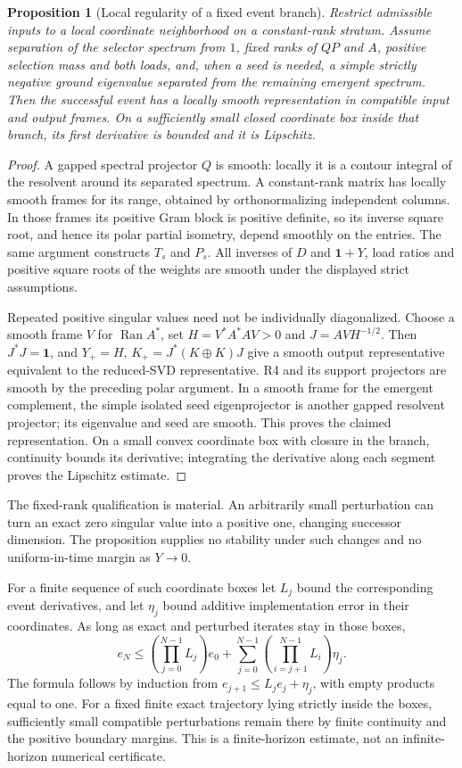 \documentclass[11pt,letterpaper]{article}
\newcommand{\Ran}{\operatorname{Ran}}
\newcommand{\Id}{\mathbf 1}
\newtheorem{proposition}[theorem]{Proposition}
\theoremstyle{definition}
\numberwithin{equation}{section}
\begin{document}
\begin{proposition}[Local regularity of a fixed event branch]\label{branchregular}
Restrict admissible inputs to a local coordinate neighborhood on a constant-rank stratum. Assume separation of the selector spectrum from $1$, fixed ranks of $QP$ and $A$, positive selection mass and both loads, and, when a seed is needed, a simple strictly negative ground eigenvalue separated from the remaining emergent spectrum. Then the successful event has a locally smooth representation in compatible input and output frames. On a sufficiently small closed coordinate box inside that branch, its first derivative is bounded and it is Lipschitz.
\end{proposition}
\begin{proof}
A gapped spectral projector $Q$ is smooth: locally it is a contour integral of the resolvent around its separated spectrum. A constant-rank matrix has locally smooth frames for its range, obtained by orthonormalizing independent columns. In those frames its positive Gram block is positive definite, so its inverse square root, and hence its polar partial isometry, depend smoothly on the entries. The same argument constructs $T_s$ and $P_s$. All inverses of $D$ and $\Id+Y$, load ratios and positive square roots of the weights are smooth under the displayed strict assumptions.

Repeated positive singular values need not be individually diagonalized. Choose a smooth frame $V$ for $\Ran A^*$, set $H=V^*A^*AV>0$ and $J=AVH^{-1/2}$. Then $J^*J=\Id$, and $Y_+=H$, $K_+=J^*(K\oplus K)J$ give a smooth output representative equivalent to the reduced-SVD representative. R4 and its support projectors are smooth by the preceding polar argument. In a smooth frame for the emergent complement, the simple isolated seed eigenprojector is another gapped resolvent projector; its eigenvalue and seed are smooth. This proves the claimed representation. On a small convex coordinate box with closure in the branch, continuity bounds its derivative; integrating the derivative along each segment proves the Lipschitz estimate.
\end{proof}
The fixed-rank qualification is material. An arbitrarily small perturbation can turn an exact zero singular value into a positive one, changing successor dimension. The proposition supplies no stability under such changes and no uniform-in-time margin as $Y\to0$.

For a finite sequence of such coordinate boxes let $L_j$ bound the corresponding event derivatives, and let $\eta_j$ bound additive implementation error in their coordinates. As long as exact and perturbed iterates stay in those boxes,
\begin{equation}\label{errorprop}
e_N\leq\left(\prod_{j=0}^{N-1}L_j\right)e_0+
\sum_{j=0}^{N-1}\left(\prod_{i=j+1}^{N-1}L_i\right)\eta_j.
\end{equation}
The formula follows by induction from $e_{j+1}\leq L_je_j+\eta_j$, with empty products equal to one. For a fixed finite exact trajectory lying strictly inside the boxes, sufficiently small compatible perturbations remain there by finite continuity and the positive boundary margins. This is a finite-horizon estimate, not an infinite-horizon numerical certificate.
\end{document}
